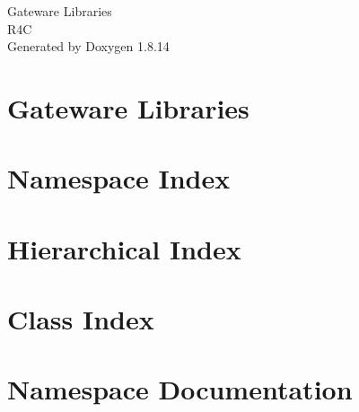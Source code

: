 \documentclass[twoside]{book}
\newcommand{\+}{\discretionary{\mbox{\scriptsize$\hookleftarrow$}}{}{}}
\newcommand{\clearemptydoublepage}{%
  \newpage{\pagestyle{empty}\cleardoublepage}%
}
\begin{document}
\hypersetup{pageanchor=false,
             bookmarksnumbered=true,
             pdfencoding=unicode
            }
\begin{titlepage}
\vspace*{7cm}
\begin{center}%
{\Large Gateware Libraries \\[1ex]\large R4C }\\
\vspace*{1cm}
{\large Generated by Doxygen 1.8.14}\\
\end{center}
\end{titlepage}
\clearemptydoublepage
{}
\tableofcontents
\clearemptydoublepage
{}
\hypersetup{pageanchor=true}

\chapter{Gateware Libraries}
\label{index}\hypertarget{index}{}
\chapter{Namespace Index}

\chapter{Hierarchical Index}

\chapter{Class Index}

\chapter{Namespace Documentation}






\end{document}
